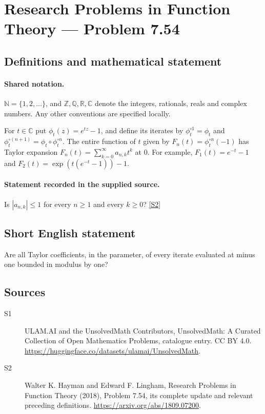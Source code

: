 \documentclass[11pt]{article}
\newcommand{\sref}[2]{\hyperlink{source:#1:#2}{[S#2]}}
\begin{document}
\section{Research Problems in Function Theory — Problem 7.54}\label{statement}

\subsection{Definitions and mathematical statement}

\paragraph{Shared notation.}$\mathbb N=\{1,2,\ldots\}$, and $\mathbb Z,\mathbb Q,\mathbb R,\mathbb C$ denote the integers, rationals, reals and complex numbers. Any other conventions are specified locally.


For $t\in\mathbb C$ put $\phi_t(z)=e^{tz}-1$, and define its iterates by $\phi_t^{\circ1}=\phi_t$ and $\phi_t^{\circ(n+1)}=\phi_t\circ\phi_t^{\circ n}$. The entire function of $t$ given by $F_n(t)=\phi_t^{\circ n}(-1)$ has Taylor expansion $F_n(t)=\sum_{k=0}^\infty a_{n,k}t^k$ at $0$. For example, $F_1(t)=e^{-t}-1$ and $F_2(t)=\exp(t(e^{-t}-1))-1$.
\paragraph{Statement recorded in the supplied source.}
Is $|a_{n,k}|\le1$ for every $n\ge1$ and every $k\ge0$? \sref{statement}{2}
\subsection{Short English statement}
Are all Taylor coefficients, in the parameter, of every iterate evaluated at minus one bounded in modulus by one?
\subsection{Sources}
\begin{description}
\item[\hypertarget{source:statement:1}{S1}] ULAM.AI and the UnsolvedMath Contributors, UnsolvedMath: A Curated Collection of Open Mathematics Problems, catalogue entry. CC BY 4.0. \url{https://huggingface.co/datasets/ulamai/UnsolvedMath}.
\item[\hypertarget{source:statement:2}{S2}] Walter K. Hayman and Edward F. Lingham, Research Problems in Function Theory (2018), Problem 7.54, its complete update and relevant preceding definitions. \url{https://arxiv.org/abs/1809.07200}.
\end{description}
\label{end:statement}
\end{document}
